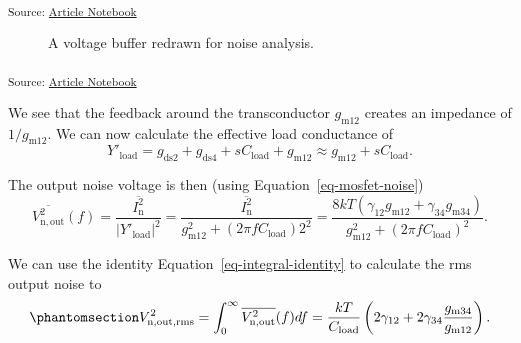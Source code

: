 \documentclass[
  a4paper,
  DIV=11,
  numbers=noendperiod]{scrartcl}
\begin{document}
\textsubscript{Source:
\href{https://iic-jku.github.io/analog-circuit-design/index.qmd.html}{Article
Notebook}}

\begin{figure}[H]


\caption{\label{fig-voltage-buffer-ota-noise}A voltage buffer redrawn
for noise analysis.}

\end{figure}%

\textsubscript{Source:
\href{https://iic-jku.github.io/analog-circuit-design/index.qmd.html}{Article
Notebook}}

We see that the feedback around the transconductor \(g_\mathrm{m12}\)
creates an impedance of \(1/g_\mathrm{m12}\). We can now calculate the
effective load conductance of \[
Y'_\mathrm{load} = g_\mathrm{ds2} + g_\mathrm{ds4} + s C_\mathrm{load} + g_\mathrm{m12} \approx g_\mathrm{m12} + s C_\mathrm{load}.
\]

The output noise voltage is then (using Equation~\ref{eq-mosfet-noise})
\[
\overline{V_\mathrm{n,out}^2}(f) = \frac{\overline{I_\mathrm{n}^2}}{|Y'_\mathrm{load}|^2} = \frac{\overline{I_\mathrm{n}^2}}{g_\mathrm{m12}^2 + (2 \pi f C_\mathrm{load})2^2} = \frac{8 k T (\gamma_{12} g_\mathrm{m12} + \gamma_{34} g_\mathrm{m34})}{g_\mathrm{m12}^2 + (2 \pi f C_\mathrm{load})^2}.
\]

We can use the identity Equation~\ref{eq-integral-identity} to calculate
the rms output noise to
\begin{equation}\phantomsection\label{eq-basic-ota-output-noise}{
V_\mathrm{n,out,rms}^2 = \int_0^\infty \overline{V_\mathrm{n,out}^2}(f) df = \frac{k T}{C_\mathrm{load}} \left( 2 \gamma_{12} + 2 \gamma_{34} \frac{g_\mathrm{m34}}{g_\mathrm{m12}} \right).
}\end{equation}
\end{document}
